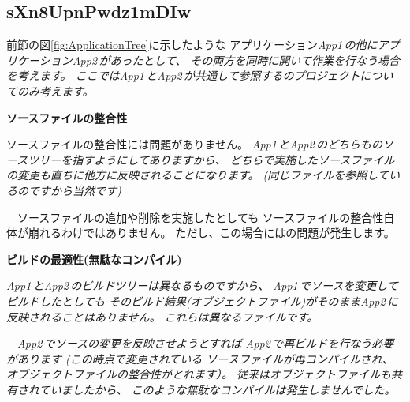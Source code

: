 \subsection{sXn8UpnPwdz1mDIw}
\label{subsec:Problems}

\def\App#1{\it{App#1\,}}
\def\App#1{\it{App#1\,}}

\noindent
\KLUDGE 前節の図\ref{fig:ApplicationTree}\KLUDGE に示したような
\KLUDGE アプリケーション\App{1}\KLUDGE の他にアプリケーション\App{2}\KLUDGE があったとして、
\KLUDGE その両方を同時に開いて作業を行なう場合を考えます。
\KLUDGE ここでは\App{1}\KLUDGE と\App{2}\KLUDGE が共通して参照する\SprLib \KLUDGE のプロジェクトについてのみ考えます。

\bigskip
\noindent
\bf{\KLUDGE ソースファイルの整合性}
\begin{narrow}[20pt]
	\KLUDGE ソースファイルの整合性には問題がありません。
	\App{1}\KLUDGE と\App{2}\KLUDGE のどちらも\SprLib \KLUDGE のソースツリーを指すようにしてありますから、
	\KLUDGE どちらで実施したソースファイルの変更も直ちに他方に反映されることになります。
	(\KLUDGE 同じファイルを参照しているのですから当然です)

	\KLUDGE 　ソースファイルの追加や削除を実施したとしても
	\KLUDGE ソースファイルの整合性自体が崩れるわけではありません。
	\KLUDGE ただし、この場合には\KLUDGE の問題が発生します。
\end{narrow}

\medskip
\noindent
\bf{\KLUDGE ビルドの最適性(\KLUDGE 無駄なコンパイル)}
\begin{narrow}[20pt]
	\App{1}\KLUDGE と\App{2}\KLUDGE のビルドツリーは異なるものですから、
	\App{1}\KLUDGE でソースを変更してビルドしたとしても
	\KLUDGE そのビルド結果(\KLUDGE オブジェクトファイル)\KLUDGE がそのまま\App{2}\KLUDGE に反映されることはありません。
	\KLUDGE これらは異なるファイルです。

	\KLUDGE 　\App{2}\KLUDGE でソースの変更を反映させようとすれば
	\App{2}\KLUDGE で再ビルドを行なう必要があります (\KLUDGE この時点で変更されている
	\KLUDGE ソースファイルが再コンパイルされ、オブジェクトファイルの整合性がとれます）。
	\KLUDGE 従来はオブジェクトファイルも共有されていましたから、
	\KLUDGE このような無駄なコンパイルは発生しませんでした。
\end{narrow}

